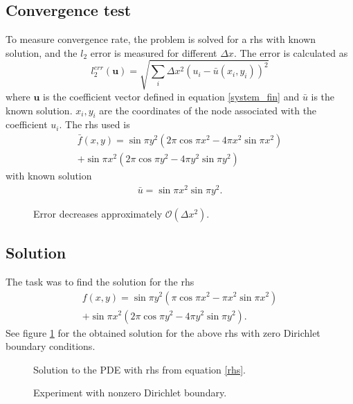 \documentclass[12pt,a4paper]{report}
\begin{document}
\subsection*{Convergence test}
To measure convergence rate, the problem is solved for a rhs with known solution, and the $l_2$ error is measured for different $\Delta x$. The error is calculated as 
\begin{equation}
    l_2^{err}(\mathbf{u}) = \sqrt{\sum_i \Delta x^2 (u_i - \bar{u}(x_i, y_i))^2}
\end{equation} where $\mathbf{u}$ is the coefficient vector defined in equation \eqref{system_fin} and $\bar{u}$ is the known solution. $x_i, y_i$ are the coordinates of the node associated with the coefficient $u_i$. The rhs used is
\begin{align}
\bar{f}(x, y) = \sin{\pi y^2}(2\pi \cos{\pi x^2} - 4 \pi x^2 \sin{\pi x^2}) \\
\nonumber
 + \sin{\pi x^2}(2 \pi \cos{\pi y^2} - 4 \pi y^2 \sin{\pi y^2})
\end{align}
with known solution
\begin{align}
\bar{u} = \sin{\pi x^2}\sin{\pi y^2}.
\end{align}


\begin{figure}
	\centering
	
	\caption{Error decreases approximately $\mathcal{O}(\Delta x^2)$. }
\end{figure}

\subsection*{Solution}
The task was to find the solution for the rhs
\begin{align}
\label{rhs}
f(x, y) = \sin{\pi y^2}(\pi \cos{\pi x^2} - \pi x^2 \sin{\pi x^2}) \\
\nonumber
+ \sin{\pi x^2}(2 \pi \cos{\pi y^2} - 4 \pi y^2 \sin{\pi y^2}).
\end{align}
See figure \ref{solution} for the obtained solution for the above rhs with zero Dirichlet boundary conditions.

\begin{figure}
	\centering
	
	\caption{\label{solution}Solution to the PDE with rhs from equation \eqref{rhs}.}
\end{figure}

\begin{figure}
	\centering
	
	\caption{Experiment with nonzero Dirichlet boundary.}
\end{figure}
\end{document}
